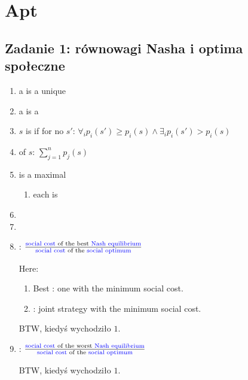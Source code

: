 \section{Apt}

\subsection{Zadanie 1: równowagi Nasha i optima społeczne}

\begin{enumerate}

  \item a
    is a unique

  \item
    a
    is a

  \item
    $s$ is
    if for no $s'$:
    $
    \forall_i p_i(s') \geq p_i(s)
    \wedge
    \exists_i p_i(s') > p_i(s)
    $

  \item
    of $s$: $\sum^n_{j=1}p_j(s)$

  \item
    is a maximal

    \begin{enumerate}
      \item
        each
        is
    \end{enumerate}

  \item

  \item

  \item
    :
    $\frac{\text{{\color{blue}{social cost}} of the best {\color{blue}{Nash equilibrium}}}}{\text{{\color{blue}{social cost}} of the {\color{blue}{social optimum}}}}$

    Here:
    \begin{enumerate}
      \item
        Best : one with the minimum social cost.
      \item
        : joint strategy with the minimum social cost.
    \end{enumerate}

    BTW, kiedyś wychodziło $1$.

  \item
    :
    $\frac{\text{{\color{blue}{social cost}} of the worst {\color{blue}{Nash equilibrium}}}}{\text{{\color{blue}{social cost}} of the {\color{blue}{social optimum}}}}$

    BTW, kiedyś wychodziło $1$.

\end{enumerate}

